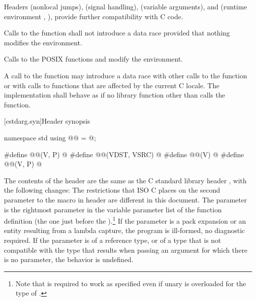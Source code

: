 \pnum
{}%
%
Headers
 (nonlocal jumps),
 (signal handling),
 (variable arguments),
and
 (runtime environment , ),
provide further compatibility with C code.

\pnum
Calls to the function
%
 shall not introduce a data
race provided that nothing modifies the environment.
\begin{note}
Calls to the POSIX functions
%
 and
%
 modify the
environment.
\end{note}

\pnum
A call to the  function
may introduce a data race with other
calls to the  function or with calls to functions that are
affected by the current C locale. The implementation shall behave as if no
library function other than  calls the 
function.

[cstdarg.syn]{Header  synopsis}

%
%
%
%
%
%
\begin{codeblock}
namespace std {
  using @@ = @\seebelow@;
}

#define @@(V, P) @\seebelow@
#define @@(VDST, VSRC) @\seebelow@
#define @@(V) @\seebelow@
#define @@(V, P) @\seebelow@
\end{codeblock}

\pnum
The contents of the header  are the same as the C
standard library header , with the following changes:
The restrictions that ISO C places on the second parameter to the
%
 macro in header 
are different in this document.
The parameter
is the rightmost parameter in the variable parameter list
of the function definition (the one just before the
).\footnote{Note that
is required to work as specified even if unary
is overloaded for the type of
.}
If the parameter  is a pack expansion or
an entity resulting from a lambda capture,
the program is ill-formed, no diagnostic required.
If the parameter
is of a reference type, or of a type that is not compatible with the
type that results when passing an argument for which there is no
parameter, the behavior is undefined.


